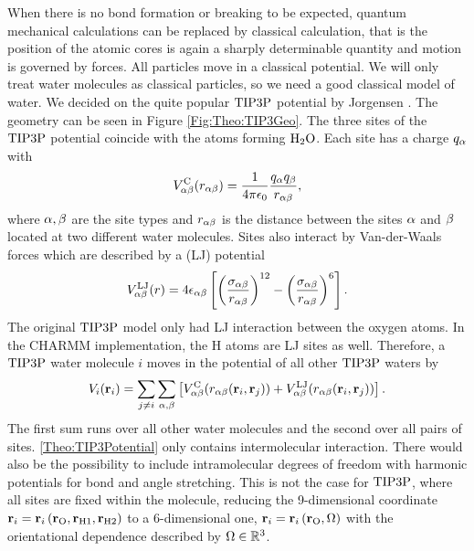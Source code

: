 \documentclass[8.5pt,twoside,twocolumn]{article}
\renewcommand\r{\bo r}
\theoremstyle{standard}
\begin{document}
When there is no bond formation or breaking to be expected, quantum mechanical
calculations can be replaced by classical calculation, that is the position
of the atomic cores is again a sharply determinable quantity and motion
is governed by forces. All particles move in a classical potential.
We will only treat water molecules as classical particles, so we need a good
classical model of water. We decided on the quite popular $\text{TIP3P}$ potential 
by Jorgensen \etal \cite{Jorgensen1983TIP3P}. The geometry can be
seen in Figure \ref{Fig:Theo:TIP3Geo}. The three sites of the $\text{TIP3P}$ potential
coincide with the atoms forming $\text H _2 \text O$. Each site has a charge $q_{\alpha}$ with 
\begin{equation}
V^{\text C}_{\alpha\beta}(r_{\alpha\beta})=\frac{1}{4\pi\epsilon_0}\frac{q_{\alpha}q_{\beta}}{r_{\alpha\beta}},
\label{Theo:TIP3EC}
\end{equation}
where $\alpha,\beta$ are the site types and $r_{\alpha\beta}$ is the distance between
the sites $\alpha$ and $\beta$ located at two different water molecules. Sites also
interact by Van-der-Waals forces which are described by a 
(LJ) potential \newcommand\ELJ{\enmat V^{\te{LJ}}_{\al\be}}
\newcommand\salbe{\enmat{\si_{\al\be}}}
\newcommand\ealbe{\enmat{\eps_{\al\be}}}
\begin{equation}
\ELJ(r)=4\ealbe\ed{\rb{\frac{\salbe}{\ralbe}}^{12}-\rb{\frac{\salbe}{\ralbe}}^{6}}.
\label{Theo:TIP3ELJ}
\end{equation}
The original $\text{TIP3P}$ model only had LJ interaction between the oxygen atoms. In
the CHARMM \cite{CHARMM} implementation, the H atoms are LJ sites as well. Therefore,
a $\text{TIP3P}$ water molecule $i$ moves in the potential of all other $\text{TIP3P}$ waters by
\begin{equation}
V_i(\r_i)=\sum_{j\neq i} \sum_{\al,\be} \ed{\EC(\ralbe(\r_i,\r_j)) + \ELJ(\ralbe(\r_i,\r_j))}.
\label{Theo:TIP3Potential}
\end{equation}
The first sum runs over all other water molecules and the second over all
pairs of sites. \eqref{Theo:TIP3Potential} only
contains intermolecular interaction. There would also be the possibility to include intramolecular degrees of freedom with
harmonic potentials for bond and angle stretching. This is not the case for $\text{TIP3P}$,
where all sites are fixed within the molecule, reducing the 9-dimensional coordinate
\mbox{$\r_i=\r_i\rb{\r_{\te O},\r_{\te H1},\r_{\te H2}}$} to a 6-dimensional one, \mbox{$\r_i=\r_i\rb{\r_{\te O},\Om}$}
with the orientational dependence described by $\Omega\in\mathbb{R}^3$.
\end{document}
